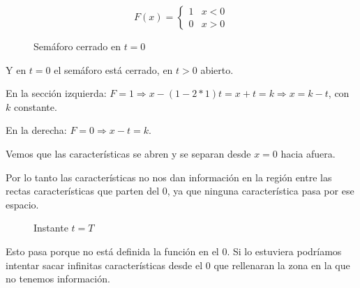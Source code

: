 		\begin{example}[Semáforo]

			$$F(x) =
			\begin{cases}
				1 & x < 0 \\
				0 & x > 0
			\end{cases}
			$$

			\begin{figure}[!htb]
				\centering
				\caption{Semáforo cerrado en $t=0$}
				\label{fig:semaforoCerrado}
			\end{figure}

			Y en $t=0$ el semáforo está cerrado, en $t>0$ abierto.

			En la sección izquierda: $ F = 1 \Rightarrow x - (1 - 2*1)t = x + t = k \Rightarrow x = k -t $, con $k$ constante.

			En la derecha: $F = 0 \Rightarrow x-t = k$.

			\begin{figure}[!htb]
				\centering
				\caption{}
				\label{fig:caracteristicasSemaforo}
			\end{figure}

			Vemos que las características se abren y se separan desde $x=0$ hacia afuera.

			Por lo tanto las características no nos dan información en la región entre las rectas características que parten del $0$, ya que ninguna característica pasa por ese espacio.

			\begin{figure}[!htb]
				\centering
				\caption{Instante $t=T$}
				\label{fig:semaforoT}
			\end{figure}

			Esto pasa porque no está definida la función en el $0$. Si lo estuviera podríamos intentar sacar infinitas características desde el 0 que rellenaran la zona en la que no tenemos información.

		\end{example}

